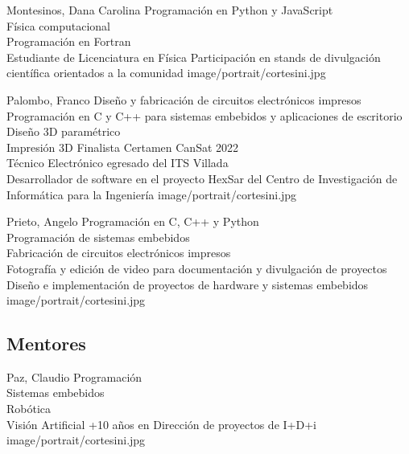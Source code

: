 \presentacion
  {Montesinos, Dana Carolina}
  {Programación en Python y JavaScript\\Física computacional\\Programación en Fortran\\Estudiante de Licenciatura en Física}
  {Participación en stands de divulgación científica orientados a la comunidad}
  {image/portrait/cortesini.jpg}

\presentacion
  {Palombo, Franco}
  {Diseño y fabricación de circuitos electrónicos impresos\\Programación en C y C++ para sistemas embebidos y aplicaciones de escritorio\\Diseño 3D paramétrico\\Impresión 3D}
  {Finalista Certamen CanSat 2022\\Técnico Electrónico egresado del ITS Villada\\Desarrollador de software en el proyecto HexSar del Centro de Investigación de Informática para la Ingeniería}
  {image/portrait/cortesini.jpg}

\presentacion
  {Prieto, Angelo}
  {Programación en C, C++ y Python\\Programación de sistemas embebidos\\Fabricación de circuitos electrónicos impresos\\Fotografía y edición de video para documentación y divulgación de proyectos}
  {Diseño e implementación de proyectos de hardware y sistemas embebidos}
  {image/portrait/cortesini.jpg}

\subsection{Mentores}
\presentacion
  {Paz, Claudio}
  {Programación\\Sistemas embebidos\\Robótica\\Visión Artificial}
  {+10 años en Dirección de proyectos de I+D+i}
  {image/portrait/cortesini.jpg}

